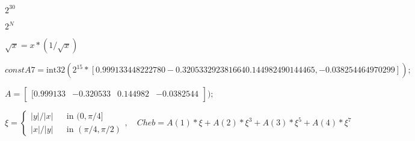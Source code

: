 \documentclass{article}
\begin{document}
$ 2^{30} $
\pagebreak

$ 2^N $
\pagebreak

$ \sqrt{x}=x*(1/\sqrt{x}) $
\pagebreak

$ constA7 = \text{int32}(2^{15}*[0.999133448222780 -0.320533292381664 0.144982490144465,-0.038254464970299]); $
\pagebreak

$ A = \begin{bmatrix}[0.999133 & -0.320533 & 0.144982 &-0.0382544 \end{bmatrix}); $
\pagebreak

$ \xi = \begin{cases} |y|/|x| && \text{in }(0, \pi/4] \\ |x|/|y| && \text{in } (\pi/4, \pi/2) \end{cases} , \quad Cheb = A(1)*\xi + A(2)*\xi^3 + A(3)*\xi^5 + A(4)*\xi^7 $
\pagebreak
\end{document}
